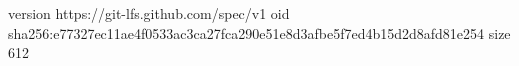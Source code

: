 version https://git-lfs.github.com/spec/v1
oid sha256:e77327ec11ae4f0533ac3ca27fca290e51e8d3afbe5f7ed4b15d2d8afd81e254
size 612
